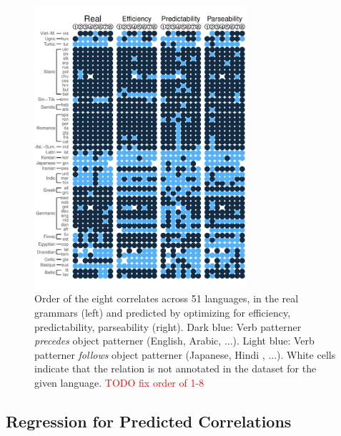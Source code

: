 \documentclass[10pt,twoside,lineno]{article}
\begin{document}
\begin{figure} 
	\begin{center}
	\includegraphics[width=0.7\textwidth]{../results/correlations/figures/pred-eff-pred-pars-families-2.pdf} %
	\end{center}
	\caption{Order of the eight correlates across 51 languages, in the real grammars (left) and predicted by optimizing for efficiency, predictability, parseability (right). Dark blue: Verb patterner \emph{precedes} object patterner (English, Arabic, ...). Light blue: Verb patterner \emph{follows} object patterner (Japanese, Hindi , ...). White cells indicate that the relation is not annotated in the dataset for the given language. \textcolor{red}{TODO fix order of 1-8}}\label{fig:per-lang}
\end{figure}

\subsection{Regression for Predicted Correlations}
\end{document}

